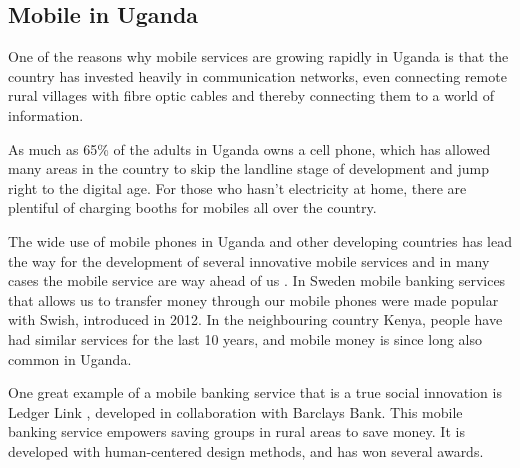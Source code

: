 \subsection{Mobile in Uganda}

One of the reasons why mobile services are growing rapidly in Uganda is that the country has invested heavily in communication networks, even connecting remote rural villages with fibre optic cables and thereby connecting them to a world of information.

As much as 65\% of the adults in Uganda owns a cell phone, which has allowed many areas in the country to skip the landline stage of development and jump right to the digital age. For those who hasn’t electricity at home, there are plentiful of charging booths for mobiles all over the country.

The wide use of mobile phones in Uganda and other developing countries has lead the way for the development of several innovative mobile services and in many cases the mobile service are way ahead of us  \citep{nissar}. In Sweden mobile banking services that allows us to transfer money through our mobile phones were made popular with Swish, introduced in 2012. In the neighbouring country Kenya, people have had similar services for the last 10 years, and mobile money is since long also common in Uganda.

One great example of a mobile banking service that is a true social innovation is Ledger Link \citep{ledgerlink}, developed in collaboration with Barclays Bank. This mobile banking service empowers saving groups in rural areas to save money. It is developed with human-centered design methods, and has won several awards.




%

